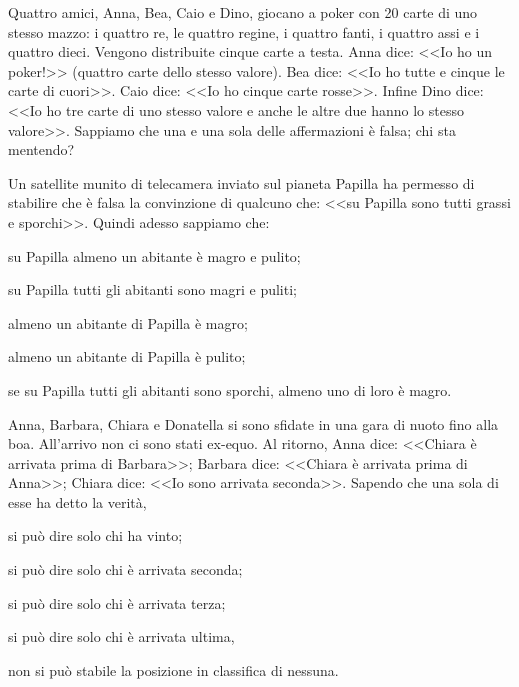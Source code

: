 \begin{esercizio}
\label{ese:\thechapter.20}
Quattro amici, Anna, Bea, Caio e Dino, giocano a poker con 20 carte
di uno stesso mazzo: i quattro re, le quattro regine, i quattro fanti,
i quattro assi e i quattro dieci. Vengono distribuite cinque carte a
testa. Anna dice: <<Io ho un poker!>> (quattro carte dello stesso
valore). Bea dice: <<Io ho tutte e cinque le carte di cuori>>. Caio dice:
<<Io ho cinque carte rosse>>. Infine Dino dice: <<Io ho tre carte di uno
stesso valore e anche le altre due hanno lo stesso valore>>. Sappiamo
che una e una sola delle affermazioni è falsa; chi sta mentendo?
\end{esercizio}

\begin{esercizio}
\label{ese:\thechapter.21}
Un satellite munito di telecamera inviato sul pianeta Papilla ha
permesso di stabilire che è falsa la convinzione di qualcuno che: <<su
Papilla sono tutti grassi e sporchi>>. Quindi adesso sappiamo che:
\begin{enumeratea}
\item su Papilla almeno un abitante è magro e pulito;
\item su Papilla tutti gli abitanti sono magri e puliti;
\item almeno un abitante di Papilla è magro;
\item almeno un abitante di Papilla è pulito; 
\item se su Papilla tutti gli abitanti sono sporchi, almeno uno di loro è magro.
\end{enumeratea}
\end{esercizio}

\begin{esercizio}
\label{ese:\thechapter.22}
Anna, Barbara, Chiara e Donatella si sono sfidate in una gara di
nuoto fino alla boa. All'arrivo non ci sono stati
ex-equo. Al ritorno, Anna dice: <<Chiara è arrivata prima di Barbara>>;
Barbara dice: <<Chiara è arrivata prima di Anna>>; Chiara dice: <<Io sono
arrivata seconda>>. Sapendo che una sola di esse ha detto la verità, 
\begin{enumeratea}
\item si può dire solo chi ha vinto;
\item si può dire solo chi è arrivata seconda;
\item si può dire solo chi è arrivata terza;
\item si può dire solo chi è arrivata ultima, 
\item non si può stabile la posizione in classifica di nessuna.
\end{enumeratea}
\end{esercizio}

